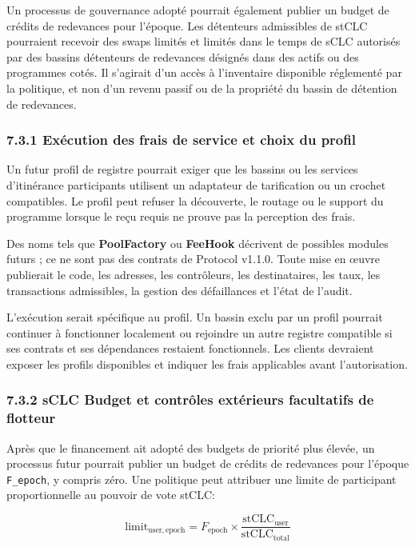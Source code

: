 \documentclass[11pt]{article}
\begin{document}
Un processus de gouvernance adopté pourrait également publier un budget de crédits de redevances pour l'époque. Les détenteurs admissibles de stCLC pourraient recevoir des swaps limités et limités dans le temps de sCLC autorisés par des bassins détenteurs de redevances désignés dans des actifs ou des programmes cotés. Il s'agirait d'un accès à l'inventaire disponible réglementé par la politique, et non d'un revenu passif ou de la propriété du bassin de détention de redevances.

\subsubsection*{7.3.1 Exécution des frais de service et choix du profil}

Un futur profil de registre pourrait exiger que les bassins ou les services d'itinérance participants utilisent un adaptateur de tarification ou un crochet compatibles. Le profil peut refuser la découverte, le routage ou le support du programme lorsque le reçu requis ne prouve pas la perception des frais.

Des noms tels que \textbf{PoolFactory } ou \textbf{ FeeHook} décrivent de possibles modules futurs ; ce ne sont pas des contrats de Protocol v1.1.0. Toute mise en œuvre publierait le code, les adresses, les contrôleurs, les destinataires, les taux, les transactions admissibles, la gestion des défaillances et l'état de l'audit.

L'exécution serait spécifique au profil. Un bassin exclu par un profil pourrait continuer à fonctionner localement ou rejoindre un autre registre compatible si ses contrats et ses dépendances restaient fonctionnels. Les clients devraient exposer les profils disponibles et indiquer les frais applicables avant l'autorisation.

\subsubsection*{7.3.2 sCLC Budget et contrôles extérieurs facultatifs de flotteur}

Après que le financement ait adopté des budgets de priorité plus élevée, un processus futur pourrait publier un budget de crédits de redevances pour l'époque \texttt{F\_epoch}, y compris zéro. Une politique peut attribuer une limite de participant proportionnelle au pouvoir de vote stCLC:

\[
\mathrm{limit}_{\mathrm{user,epoch}} = F_{\mathrm{epoch}} \times \frac{\mathrm{stCLC}_{\mathrm{user}}}{\mathrm{stCLC}_{\mathrm{total}}}
\]
\end{document}
